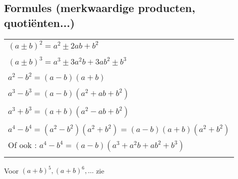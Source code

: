 \subsection{Formules (merkwaardige producten, quoti\"enten...)} \label{formules}
\hypertarget{formules}{}
\begin{tabular}{l}
$(a\pm b)^2 = a^2\pm 2ab +b^2$\\\\
$(a\pm b)^3 = a^3\pm 3a^2b +3ab^2\pm b^3$\\\\
$a^2-b^2 = (a-b)(a+b)$\\\\
$a^3-b^3 = (a-b)(a^2+ab+b^2)$\\\\
$a^3+b^3 = (a+b)(a^2-ab+b^2)$\\\\
$a^4-b^4 = (a^2-b^2)(a^2+b^2)=(a-b)(a+b)(a^2+b^2)$\\
Of ook : $a^4-b^4=(a-b)(a^3+a^2b+ab^2+b^3)$\\\\
\end{tabular} \newline
Voor $(a+b)^5, (a+b)^6,\ldots$ zie %

